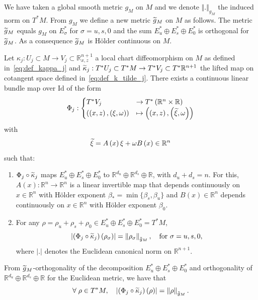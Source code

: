\documentclass[10pt]{amsart}
\theoremstyle{definition}\newtheorem{defi}[theo]{Definition}\newtheorem{rema}[theo]{Remark}\newtheorem{exam}[theo]{Example}\newtheorem{exem}[theo]{Example}\newtheorem{nota}[theo]{Notation}
\newcommand{\Id}{\mathrm{Id}}
\newcommand{\bbR}{\mathbb{R}}
\let\oldtilde\tilde
\renewcommand*{\tilde}[1]{\mathchoice{\widetilde{#1}}{\widetilde{#1}}{\oldtilde{#1}}{\oldtilde{#1}}}
\let\oldforall\forall
\renewcommand*{\forall}{\mathrel{\oldforall}}
\begin{document}
We have taken a global smooth metric $g_{M}$ on $M$ and we denote $\Vert.\Vert _{g_{M}}$ the induced norm on $T^{*}M$. From $g_{M}$ we define a new metric $\tilde{g}_{M}$ on $M$ as follows. The metric $\tilde{g}_{M}$ equals $g_{M}$ on $E_{\sigma}^{*}$ for $\sigma=u,s,0$ and the sum $E_{u}^{*}\oplus E_{s}^{*}\oplus E_{0}^{*}$ is orthogonal for $\tilde{g}_{M}$. As a consequence $\tilde{g}_{M}$ is H\"older continuous on $M$.

Let $\kappa_{j}:U_{j}\subset M\rightarrow V_{j}\subset\bbR_{x,z}^{n+1}$ a local chart diffeomorphism on $M$ as defined in~\eqref{eq:def_kappa_j} and $\tilde{\kappa}_{j}:T^{*}U_{j}\subset T^{*}M\rightarrow T^{*}V_{j}\subset T^{*}\bbR^{n+1}$ the lifted map on cotangent space defined in~\eqref{eq:def_k_tilde_j}. There exists a continuous linear bundle map over $\Id $ of the form
\begin{equation}\label{eq:def_Phi}
\Phi_{j}:
\begin{cases}
T^{*}V_{j} & \rightarrow T^{*}\left(\bbR^{n}\times\bbR\right)\\
\left(\left(x,z\right),\left(\xi,\omega\right)\right) & \mapsto\left(\left(x,z\right),\left(\tilde{\xi},\omega\right)\right)
\end{cases}
\end{equation}
with
\begin{equation}\label{eq:xi_tilde}
\tilde{\xi}=A\left(x\right)\xi+\omega B\left(x\right)\in\bbR^{n}
\end{equation}
such that:
\begin{enumerate}
\item $\Phi_{j}\circ\tilde{\kappa}_{j}$ maps $E_{u}^{*}\oplus E_{s}^{*}\oplus E_{0}^{*}$ to $\bbR^{d_{u}}\oplus\bbR^{d_{s}}\oplus\bbR$, with $d_{u}+d_{s}=n$. For this, $A(x):\bbR^{n}\rightarrow\bbR^{n}$ is a linear invertible map that depends continuously on $x\in\bbR^{n}$ with H\"older exponent $\beta_{*}=\min\{\beta_{s},\beta_{u}\}$ and $B(x)\in\bbR^{n}$ depends continuously on $x\in\bbR^{n}$ with H\"older exponent $\beta_{0}$.
\item For any $\rho=\rho_{u}+\rho_{s}+\rho_{0}\in E_{u}^{*}\oplus E_{s}^{*}\oplus E_{0}^{*}=T^{*}M$,
\begin{equation}\label{eq:prop_Phi}
\left|\left(\Phi_{j}\circ\tilde{\kappa}_{j}\right)\left(\rho_{\sigma}\right)\right|=\left\Vert \rho_{\sigma}\right\Vert _{\tilde{g}_{M}},\quad\text{for }\sigma=u,s,0,
\end{equation}
where $|.|$ denotes the Euclidean canonical norm on $\bbR^{n+1}$.
\end{enumerate}
From $\tilde{g}_{M}$-orthogonality of the decomposition $E_{u}^{*}\oplus E_{s}^{*}\oplus E_{0}^{*}$ and orthogonality of $\bbR^{d_{u}}\oplus\bbR^{d_{s}}\oplus\bbR$ for the Euclidean metric, we have that
\begin{equation}\label{eq:prop_Phi_1}
\forall\rho\in T^{*}M,\quad\left|\left(\Phi_{j}\circ\tilde{\kappa}_{j}\right)\left(\rho\right)\right|=\left\Vert \rho\right\Vert _{\tilde{g}_{M}}.
\end{equation}
\end{document}
